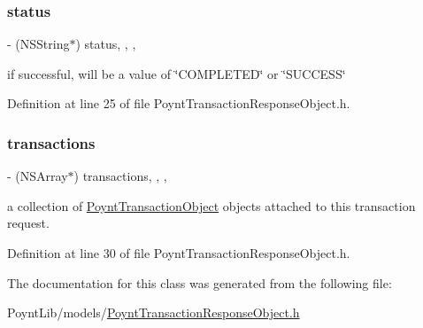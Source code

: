 \subsubsection{\texorpdfstring{status}{status}}
{\footnotesize\ttfamily -\/ (N\+S\+String$\ast$) status\hspace{0.3cm}{\ttfamily [read]}, {\ttfamily [write]}, {\ttfamily [nonatomic]}, {\ttfamily [copy]}}

if successful, will be a value of \char`\"{}\+C\+O\+M\+P\+L\+E\+T\+E\+D\char`\"{} or \char`\"{}\+S\+U\+C\+C\+E\+S\+S\char`\"{} 

Definition at line 25 of file Poynt\+Transaction\+Response\+Object.\+h.

\hypertarget{interface_poynt_transaction_response_object_a12474d50a1838843bcc1cacbbc30c4d2}{}\label{interface_poynt_transaction_response_object_a12474d50a1838843bcc1cacbbc30c4d2} 
\subsubsection{\texorpdfstring{transactions}{transactions}}
{\footnotesize\ttfamily -\/ (N\+S\+Array$\ast$) transactions\hspace{0.3cm}{\ttfamily [read]}, {\ttfamily [write]}, {\ttfamily [nonatomic]}, {\ttfamily [strong]}}

a collection of \hyperlink{interface_poynt_transaction_object}{Poynt\+Transaction\+Object} objects attached to this transaction request. 

Definition at line 30 of file Poynt\+Transaction\+Response\+Object.\+h.



The documentation for this class was generated from the following file\+:\begin{DoxyCompactItemize}
\item 
Poynt\+Lib/models/\hyperlink{_poynt_transaction_response_object_8h}{Poynt\+Transaction\+Response\+Object.\+h}\end{DoxyCompactItemize}
